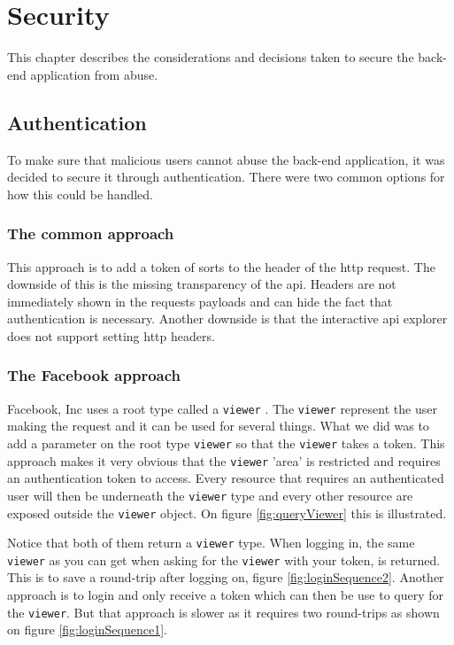 \section{Security}
This chapter describes the considerations and decisions taken to secure the back-end application from abuse.

\subsection{Authentication}
To make sure that malicious users cannot abuse the back-end application, it was decided to secure it through authentication. 
There were two common options for how this could be handled. 

\subsubsection{The common approach}
This approach is to add a token of sorts to the header of the \gls{http} request. 
The downside of this is the missing transparency of the \gls{api}.
Headers are not immediately shown in the requests payloads and can hide the fact that authentication is necessary.
Another downside is that the interactive \gls{api} explorer  does not support setting \gls{http} headers.

\subsubsection{The Facebook approach}
Facebook, Inc uses a root type called a \verb+viewer+ \citep{facebook:viewer}. 
The \verb+viewer+ represent the user making the request and it can be used for several things. 
What we did was to add a parameter on the root type \verb+viewer+ so that the \verb+viewer+ takes a token. 
This approach makes it very obvious that the \verb+viewer+ 'area' is restricted and requires an authentication token to access. 
Every resource that requires an authenticated user will then be underneath the \verb+viewer+ type and every other resource are exposed outside the \verb+viewer+ object. 
On figure \ref{fig:queryViewer} this is illustrated.


Notice that both of them return a \verb+viewer+ type. 
When logging in, the same \verb+viewer+ as you can get when asking for the \verb+viewer+ with your token, is returned. 
This is to save a round-trip after logging on, figure \ref{fig:loginSequence2}. 
Another approach is to login and only receive a token which can then be use to query for the \verb+viewer+. 
But that approach is slower as it requires two round-trips as shown on figure \ref{fig:loginSequence1}.

